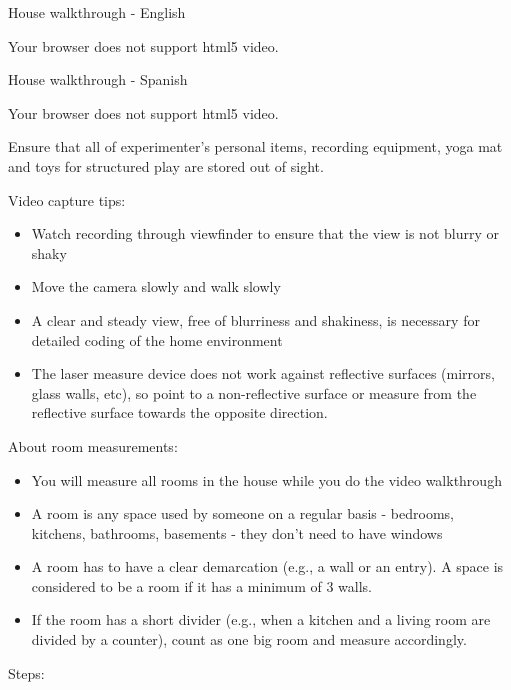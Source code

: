 \documentclass[
  12pt,
]{book}
\providecommand{\tightlist}{%
  \setlength{\itemsep}{0pt}\setlength{\parskip}{0pt}}
\begin{document}
House walkthrough - English

Your browser does not support html5 video.

House walkthrough - Spanish

Your browser does not support html5 video.

Ensure that all of experimenter's personal items, recording equipment, yoga mat and toys for structured play are stored out of sight.

Video capture tips:

\begin{itemize}
\tightlist
\item
  Watch recording through viewfinder to ensure that the view is not blurry or shaky\\
\item
  Move the camera slowly and walk slowly\\
\item
  A clear and steady view, free of blurriness and shakiness, is necessary for detailed coding of the home environment
\item
  The laser measure device does not work against reflective surfaces (mirrors, glass walls, etc), so point to a non-reflective surface or measure from the reflective surface towards the opposite direction.
\end{itemize}

About room measurements:

\begin{itemize}
\tightlist
\item
  You will measure all rooms in the house while you do the video walkthrough\\
\item
  A room is any space used by someone on a regular basis - bedrooms, kitchens, bathrooms, basements - they don't need to have windows\\
\item
  A room has to have a clear demarcation (e.g., a wall or an entry). A space is considered to be a room if it has a minimum of 3 walls.
\item
  If the room has a short divider (e.g., when a kitchen and a living room are divided by a counter), count as one big room and measure accordingly.
\end{itemize}

Steps:
\end{document}
